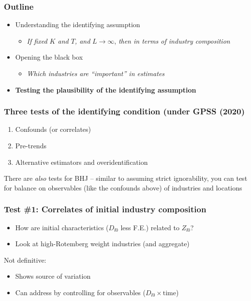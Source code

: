 \documentclass[notes,11pt, aspectratio=169]{beamer}
\newenvironment{wideitemize}{\itemize\addtolength{\itemsep}{10pt}}{\enditemize}
\begin{document}
\begin{frame}[plain]
\addtocounter{framenumber}{-1}
\frametitle{Outline}


\begin{itemize}
\setlength\itemsep{1em}
\item Understanding the identifying assumption
	\begin{itemize}
	\item \textit{If fixed $K$ and $T$, and} $L \rightarrow \infty$,\textit{ then in terms of industry composition}
	\end{itemize}
\item Opening the black box
	\begin{itemize}
	\item \textit{Which industries are ``important'' in estimates}
	\end{itemize}
\item \textbf{Testing the plausibility of the identifying assumption}
\end{itemize}



\end{frame}


\begin{frame}
\frametitle{Three tests of the identifying condition (under GPSS (2020)}

\begin{enumerate}
\item Confounds (or correlates)
\item Pre-trends 
\item Alternative estimators and overidentification
\end{enumerate}

\begin{wideitemize}
\item There are \emph{also} tests for BHJ -- similar to assuming
  strict ignorability, you can test for balance on observables
  (like the confounds above) of industries and locations
\end{wideitemize}

\end{frame}



\begin{frame}
\frametitle{Test \#1: Correlates of initial industry composition}

\begin{itemize}
\setlength\itemsep{1em}
\item How are initial characteristics ($D_{l0}$ less F.E.) related to $Z_{l0}$?
\item Look at high-Rotemberg weight industries (and aggregate)
\end{itemize} 

Not definitive:
\begin{itemize}
\setlength\itemsep{1em}
\item Shows source of variation
\item Can address by controlling for observables ($D_{l0} \times \text{time}$)
\end{itemize}

\end{frame}
\end{document}
